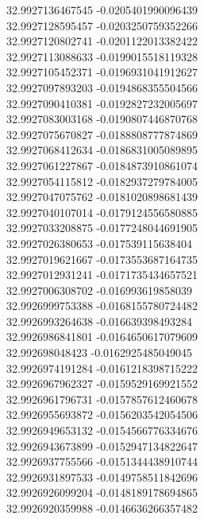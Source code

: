 {32.9927136467545	-0.0205401990096439\\
32.9927128595457	-0.0203250759352266\\
32.9927120802741	-0.0201122013382422\\
32.9927113088633	-0.0199015518119328\\
32.9927105452371	-0.0196931041912627\\
32.9927097893203	-0.0194868355504566\\
32.9927090410381	-0.0192827232005697\\
32.9927083003168	-0.0190807446870768\\
32.9927075670827	-0.0188808777874869\\
32.9927068412634	-0.0186831005089895\\
32.9927061227867	-0.0184873910861074\\
32.9927054115812	-0.0182937279784005\\
32.9927047075762	-0.0181020898681439\\
32.9927040107014	-0.0179124556580885\\
32.9927033208875	-0.0177248044691905\\
32.9927026380653	-0.017539115638404\\
32.9927019621667	-0.0173553687164735\\
32.9927012931241	-0.0171735434657521\\
32.9927006308702	-0.016993619858039\\
32.9926999753388	-0.0168155780724482\\
32.9926993264638	-0.016639398493284\\
32.9926986841801	-0.0164650617079609\\
32.992698048423	-0.0162925485049045\\
32.9926974191284	-0.0161218398715222\\
32.9926967962327	-0.0159529169921552\\
32.9926961796731	-0.0157857612460678\\
32.9926955693872	-0.0156203542054506\\
32.9926949653132	-0.0154566776334676\\
32.9926943673899	-0.0152947134822647\\
32.9926937755566	-0.0151344438910744\\
32.9926931897533	-0.0149758511842696\\
32.9926926099204	-0.0148189178694865\\
32.9926920359988	-0.0146636266357482\\
}
